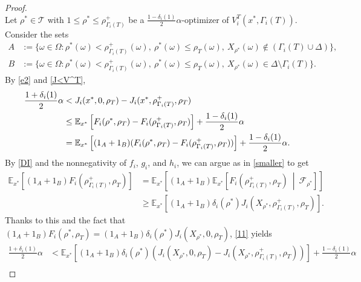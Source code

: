 \documentclass[11pt,reqno]{article}
\numberwithin{equation}{section}
\newcommand{\E}{\mathbb{E}}
\newcommand{\F}{\mathcal{F}}
\newcommand{\T}{\mathcal{T}}
\begin{document}
\begin{proof}
\begin{equation}
\end{equation}
Let $\rho^*\in\T$ with $1\le \rho^*\le \rho^+_{\Gamma_i(T)}$ be a $\frac{1-\delta_i(1)}{2}\alpha$-optimizer of $V_i^T(x^*,\Gamma_i(T))$. Consider the sets
\begin{align*}
A&:=\{\omega\in\Omega: \rho^*(\omega)<\rho^+_{\Gamma_i(T)}(\omega),\ \rho^*(\omega)\leq\rho_T(\omega),\ X_{\rho^*}(\omega)\notin(\Gamma_i(T)\cup\Delta)\},\\
B&:=\{\omega\in\Omega: \rho^*(\omega)<\rho^+_{\Gamma_i(T)}(\omega),\ \rho^*(\omega)\leq\rho_T(\omega),\ X_{\rho^*}(\omega)\in\Delta\setminus \Gamma_i(T)\}.
\end{align*}
By \eqref{e2} and \eqref{J<V^T}, 
\begin{align}
\frac{1+\delta_i(1)}{2}\alpha&<J_i(x^*,0,\rho_T)-J_i(x^*,\rho^+_{\Gamma_i(T)},\rho_T)\notag\\
&\leq\E_{x^*}\left[F_i(\rho^*,\rho_T)-F_i(\rho^+_{\Gamma_i(T)},\rho_T)\right]+\frac{1-\delta_i(1)}{2}\alpha\notag\\
&=\E_{x^*}\left[(1_A+1_B)(F_i(\rho^*,\rho_T)-F_i(\rho^+_{\Gamma_i(T)},\rho_T))\right]+\frac{1-\delta_i(1)}{2}\alpha.\label{11}%
\end{align}
By \eqref{DI} and the nonnegativity of $f_i$, $g_i$, and $h_i$, we can argue as in \eqref{smaller} to get
\begin{align*}
\E_{x^*}\left[(1_A+1_B) F_i(\rho^+_{\Gamma_i(T)},\rho_T)\right] &= \E_{x^*}\left[(1_A+1_B)\E_{x^*}\left[ F_i(\rho^+_{\Gamma_i(T)},\rho_T)\ \middle|\ \F_{\rho^*}\right]\right]\\
&\ge \E_{x^*}\left[(1_A+1_B) \delta_i(\rho^*) J_i(X_{\rho^*},\rho^+_{\Gamma_i(T)},\rho_T)\right].   
\end{align*}
Thanks to this and the fact that $(1_{A}+1_B) F_i(\rho^*,\rho_T) = (1_{A}+1_B) \delta_i(\rho^*) J_i(X_{\rho^*}, 0,\rho_T)$, \eqref{11} yields
\begin{align*}
\frac{1+\delta_i(1)}{2}\alpha&<\E_{x^*}\left[(1_A+1_B)\delta_i(\rho^*)(J_i(X_{\rho^*},0,\rho_T)-J_i(X_{\rho^*},\rho^+_{\Gamma_i(T)},\rho_T))\right]+\frac{1-\delta_i(1)}{2}\alpha\\

\end{align*}
\end{proof}
\end{document}
